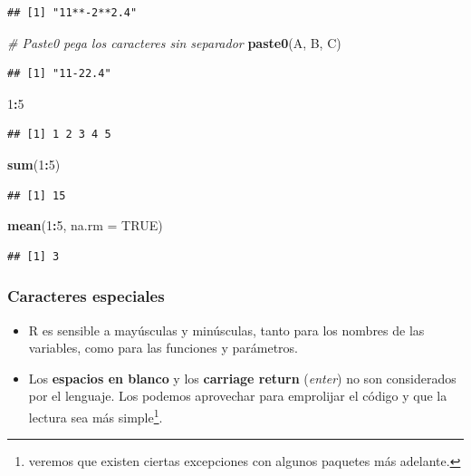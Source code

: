 \documentclass[]{book}
\newenvironment{Shaded}{\begin{snugshade}}{\end{snugshade}}
\newcommand{\CommentTok}[1]{\textcolor[rgb]{0.56,0.35,0.01}{\textit{#1}}}
\newcommand{\DataTypeTok}[1]{\textcolor[rgb]{0.13,0.29,0.53}{#1}}
\newcommand{\DecValTok}[1]{\textcolor[rgb]{0.00,0.00,0.81}{#1}}
\newcommand{\KeywordTok}[1]{\textcolor[rgb]{0.13,0.29,0.53}{\textbf{#1}}}
\newcommand{\NormalTok}[1]{#1}
\newcommand{\OperatorTok}[1]{\textcolor[rgb]{0.81,0.36,0.00}{\textbf{#1}}}
\newcommand{\OtherTok}[1]{\textcolor[rgb]{0.56,0.35,0.01}{#1}}
\providecommand{\tightlist}{%
  \setlength{\itemsep}{0pt}\setlength{\parskip}{0pt}}
\let\rmarkdownfootnote\footnote%
\def\footnote{\protect\rmarkdownfootnote}
\begin{document}
\begin{verbatim}
## [1] "11**-2**2.4"
\end{verbatim}

\begin{Shaded}
\begin{Highlighting}[]
\CommentTok{# Paste0 pega los caracteres sin separador}
\KeywordTok{paste0}\NormalTok{(A, B, C)}
\end{Highlighting}
\end{Shaded}

\begin{verbatim}
## [1] "11-22.4"
\end{verbatim}

\begin{Shaded}
\begin{Highlighting}[]
\DecValTok{1}\OperatorTok{:}\DecValTok{5}
\end{Highlighting}
\end{Shaded}

\begin{verbatim}
## [1] 1 2 3 4 5
\end{verbatim}

\begin{Shaded}
\begin{Highlighting}[]
\KeywordTok{sum}\NormalTok{(}\DecValTok{1}\OperatorTok{:}\DecValTok{5}\NormalTok{)}
\end{Highlighting}
\end{Shaded}

\begin{verbatim}
## [1] 15
\end{verbatim}

\begin{Shaded}
\begin{Highlighting}[]
\KeywordTok{mean}\NormalTok{(}\DecValTok{1}\OperatorTok{:}\DecValTok{5}\NormalTok{, }\DataTypeTok{na.rm =} \OtherTok{TRUE}\NormalTok{)}
\end{Highlighting}
\end{Shaded}

\begin{verbatim}
## [1] 3
\end{verbatim}

\hypertarget{caracteres-especiales}{%
\subsubsection{Caracteres especiales}\label{caracteres-especiales}}

\begin{itemize}
\tightlist
\item
  R es sensible a mayúsculas y minúsculas, tanto para los nombres de las variables, como para las funciones y parámetros.
\item
  Los \textbf{espacios en blanco} y los \textbf{carriage return} (\emph{enter}) no son considerados por el lenguaje. Los podemos aprovechar para emprolijar el código y que la lectura sea más simple\footnote{veremos que existen ciertas excepciones con algunos paquetes más adelante.}.
\end{itemize}
\end{document}
